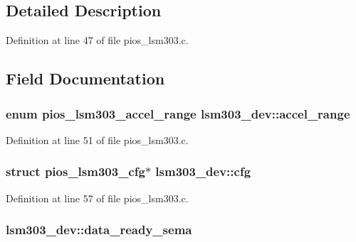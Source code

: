 \subsection{Detailed Description}


Definition at line 47 of file pios\-\_\-lsm303.\-c.



\subsection{Field Documentation}
\hypertarget{structlsm303__dev_a925acad41a5880d09927a1d63130e055}{
\subsubsection[{accel\-\_\-range}]{\setlength{\rightskip}{0pt plus 5cm}enum {\bf pios\-\_\-lsm303\-\_\-accel\-\_\-range} lsm303\-\_\-dev\-::accel\-\_\-range}}\label{structlsm303__dev_a925acad41a5880d09927a1d63130e055}


Definition at line 51 of file pios\-\_\-lsm303.\-c.

\hypertarget{structlsm303__dev_ad5dc8f3a8d9729f36b59e641a907c232}{
\subsubsection[{cfg}]{\setlength{\rightskip}{0pt plus 5cm}struct {\bf pios\-\_\-lsm303\-\_\-cfg}$\ast$ lsm303\-\_\-dev\-::cfg}}\label{structlsm303__dev_ad5dc8f3a8d9729f36b59e641a907c232}


Definition at line 57 of file pios\-\_\-lsm303.\-c.

\hypertarget{structlsm303__dev_ab14a7b6518eb1699835c6d284425a6bb}{
\subsubsection[{data\-\_\-ready\-\_\-sema}]{ lsm303\-\_\-dev\-::data\-\_\-ready\-\_\-sema}}\label{structlsm303__dev_ab14a7b6518eb1699835c6d284425a6bb}


